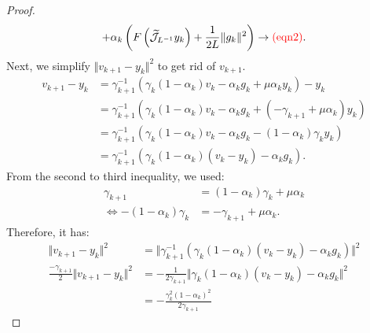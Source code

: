 \documentclass[12pt]{article}
\begin{document}
\begin{proof}
\begin{align*}
            + 
            \alpha_k\left(
                F\left(\widetilde{\mathcal J}_{L^{-1}} y_k\right) 
                + 
                \frac{1}{2L} \Vert g_k\Vert^2
            \right)
            \rightarrow 
            \textcolor{red}{(\text{eqn2})}. 
        \end{align*}
        Next, we simplify $\Vert v_{k + 1} - y_k\Vert^2$ to get rid of $v_{k + 1}$. 
        \begin{align*}
            v_{k + 1} - y_k 
            &= 
            \gamma_{k + 1}^{-1}
            \left(
                \gamma_k(1 - \alpha_k) v_k - \alpha_k g_k + \mu \alpha_k y_k
            \right) - y_k
            \\
            &= 
            \gamma_{k + 1}^{-1}
            \left(
                \gamma_k(1 - \alpha_k)v_k - \alpha_k g_k 
                + (-\gamma_{k + 1} + \mu\alpha_k)y_k
            \right)
            \\
            &=
            \gamma_{k + 1}^{-1}
            \left(
                \gamma_k(1 - \alpha_k)v_k - \alpha_k g_k - 
                (1 - \alpha_k)\gamma_ky_k
            \right)
            \\
            &= 
            \gamma_{k + 1}^{-1}(
                \gamma_k(1 - \alpha_k)(v_k - y_k) 
                - \alpha_k g_k
            ).
        \end{align*}
        From the second to third inequality, we used: 
        \begin{align*}
            \gamma_{k + 1} &=    
                (1 - \alpha_k)\gamma_k + \mu \alpha_k
                \\
                \iff 
                -(1 - \alpha_k)\gamma_k
                &= - \gamma_{k + 1} + \mu \alpha_k. 
        \end{align*}
        Therefore, it has: 
        {\small
        \begin{align*}
            \Vert v_{k + 1} - y_k\Vert^2 
            &= 
            \Vert 
                \gamma_{k + 1}^{-1}(
                    \gamma_k(1 - \alpha_k)(v_k - y_k) 
                    - \alpha_k g_k
                )
            \Vert^2
            \\
            \frac{- \gamma_{k + 1}}{2}
            \Vert v_{k + 1} - y_k\Vert^2
            &= 
            - \frac{1}{2\gamma_{k + 1}}
            \Vert 
                \gamma_k(1 - \alpha_k)(v_k - y_k) - \alpha_k g_k
            \Vert^2
            \\
            &= 
            -\frac{\gamma_k^2 (1 - \alpha_k)^2}{2 \gamma_{k + 1}} 

\end{align*}}
\end{proof}
\end{document}
